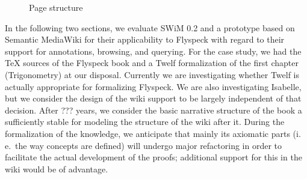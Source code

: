 \documentclass{llncs}
\begin{document}
\newcommand{\wikipage}[5]{\node[draw,text width=5cm,font=\tiny\sffamily] (#1) at #2 {
    {\footnotesize\bfseries #3}\\
    #4
    ~\\[1em]
    [Download Isabelle representation]\\
    #5
  };}
\begin{figure}
  \centering
  \caption{Page structure}
  \label{fig:pagestructure}
\end{figure}

In the following two sections, we evaluate SWiM 0.2 and a prototype based on Semantic
MediaWiki for their applicability to Flyspeck with regard to their support for
annotations, browsing, and querying.  For the case study, we had the {\TeX} sources of the
Flyspeck book and a Twelf formalization of the first chapter (Trigonometry) at our
disposal.  Currently we are
investigating whether Twelf is actually appropriate for formalizing Flyspeck.  We are also
investigating Isabelle, but we consider the design of the wiki support to be largely
independent of that decision.  After ??? years, we consider
the basic narrative structure of the book a sufficiently stable for modeling the structure
of the wiki after it.  During the formalization of the knowledge, we anticipate that
mainly its axiomatic parts (i.\,e.\ the way concepts are defined) will undergo major
refactoring in order to facilitate the actual development of the proofs; additional
support for this in the wiki would be of advantage.
\end{document}
